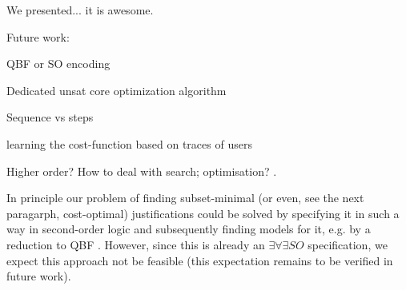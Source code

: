 
We presented... it is awesome.

Future work:
\begin{compactitem}
 \item QBF or SO encoding
 \item Dedicated unsat core optimization algorithm
  \item Sequence vs steps
  \item learning the cost-function based on traces of users
  \item 
\end{compactitem}

% 
Higher order? How to deal with search; optimisation? .


In principle our problem of finding subset-minimal (or even, see the next paragarph, cost-optimal) justifications could be solved by specifying it in such a way in second-order logic and subsequently finding models for it, e.g. by a reduction to QBF \cite{kr/BogaertsTS16,kr/vanderHallenJ18}. 
However, since this is already an $\exists\forall\exists SO$ specification, we expect this approach not be feasible (this expectation remains to be verified in future work). 

